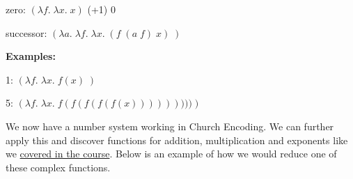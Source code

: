 \documentclass{article}
\begin{document}
        \medskip
        zero: $(\lambda f. \; \lambda x. \; x)$ (+1) 0
        
        successor: $(\lambda a. \; \lambda f. \; \lambda x. \; (f \; (a \; f) \; x) \; )$
        
        \medskip
        \textbf{Examples:}
        
        1: $(\lambda f. \; \lambda x. \; f (x) \; )$
        
        5: $(\lambda f. \; \lambda x. \; f (f (f (f (f (x))))))))) \; )$
        
        \medskip\noindent
        We now have a number system working in Church Encoding. We can further apply this and discover functions for addition, multiplication and exponents like we \href{https://hackmd.io/@alexhkurz/SyowcD9XF#Homework}{covered in the course}. Below is an example of how we would reduce one of these complex functions.
        
\end{document}
